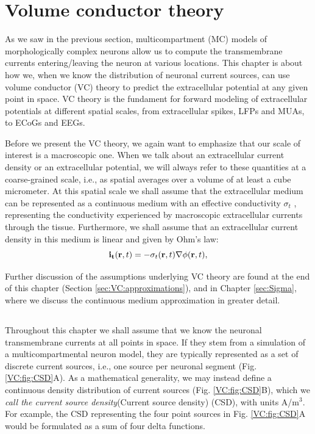 \chapter{Volume conductor theory}
\label{sec:VC}
As we saw in the previous section, multicompartment (MC) models of morphologically complex neurons allow us to compute the transmembrane currents entering/leaving the neuron at various locations. This chapter is about how we, when we know the distribution of neuronal current sources, can use volume conductor (VC) theory to predict the extracellular potential at any given point in space. VC theory is the fundament for forward modeling of extracellular potentials at different spatial scales, from extracellular spikes, LFPs and MUAs, to ECoGs and EEGs.

Before we present the VC theory, we again want to emphasize that our scale of interest is a macroscopic one. When we talk about an extracellular current density or an extracellular potential, we will always refer to these quantities at a coarse-grained scale, i.e., as spatial averages over a volume of at least a cube micrometer. At this spatial scale we shall assume that the extracellular medium can be represented as a continuous medium  with an effective conductivity $\sigma_t$  , representing the conductivity experienced by macroscopic extracellular currents through the tissue. Furthermore, we shall assume that an extracellular current density in this medium is linear and given by Ohm's law:
\begin{equation}
{\bf i_t}({\bf r}, t) = - \sigma_t({\bf r}, t) \nabla \phi({\bf r}, t),
\label{VC:eq:ohmici}
\end{equation}

Further discussion of the assumptions underlying VC theory are found at the end of this chapter (Section \ref{sec:VC:approximations}), and in Chapter \ref{sec:Sigma}, where we discuss the continuous medium approximation in greater detail.


\section{}
\label{sec:VC:main}
Throughout this chapter we shall assume that we know the neuronal transmembrane currents at all points in space. If they stem from a simulation of a multicompartmental neuron model, they are typically represented as a set of discrete current sources, i.e., one source per neuronal segment (Fig. \ref{VC:fig:CSD}A). As a mathematical generality, we may instead define a continuous density distribution of current sources (Fig. \ref{VC:fig:CSD}B), which we \textit{call the current source density}\index(Current source density) (CSD), with units A/m$^3$. For example, the CSD representing the four point sources in Fig. \ref{VC:fig:CSD}A would be formulated as a sum of four delta functions. 

